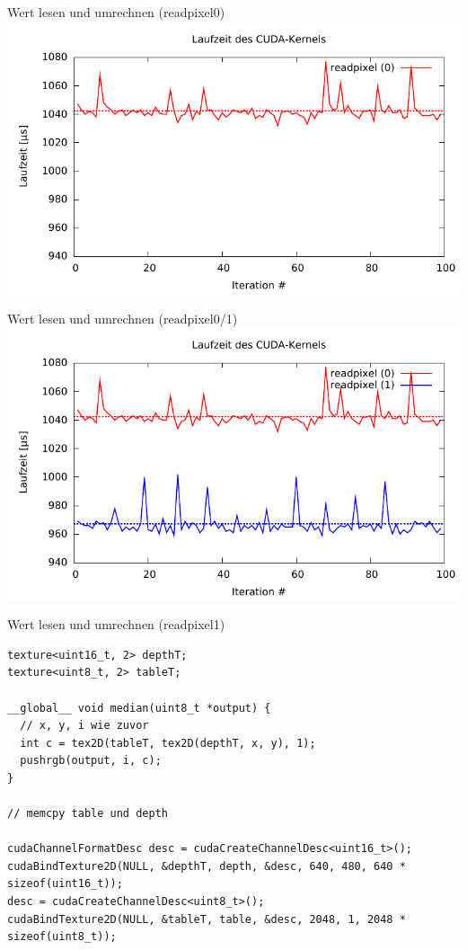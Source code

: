 \documentclass[compress]{beamer}
\begin{document}
\begin{frame}[fragile]{Wert lesen und umrechnen (readpixel0)}
\includegraphics[width=\textwidth]{readpixel0.pdf}
\end{frame}

\begin{frame}[fragile]{Wert lesen und umrechnen (readpixel0/1)}
\includegraphics[width=\textwidth]{readpixel01.pdf}
\end{frame}

\begin{frame}[fragile]{Wert lesen und umrechnen (readpixel1)}
\begin{lstlisting}
texture<uint16_t, 2> depthT;
texture<uint8_t, 2> tableT;

__global__ void median(uint8_t *output) {
  // x, y, i wie zuvor
  int c = tex2D(tableT, tex2D(depthT, x, y), 1);
  pushrgb(output, i, c);
}

// memcpy table und depth

cudaChannelFormatDesc desc = cudaCreateChannelDesc<uint16_t>();
cudaBindTexture2D(NULL, &depthT, depth, &desc, 640, 480, 640 * sizeof(uint16_t));
desc = cudaCreateChannelDesc<uint8_t>();
cudaBindTexture2D(NULL, &tableT, table, &desc, 2048, 1, 2048 * sizeof(uint8_t));
\end{lstlisting}
\end{frame}
\end{document}
